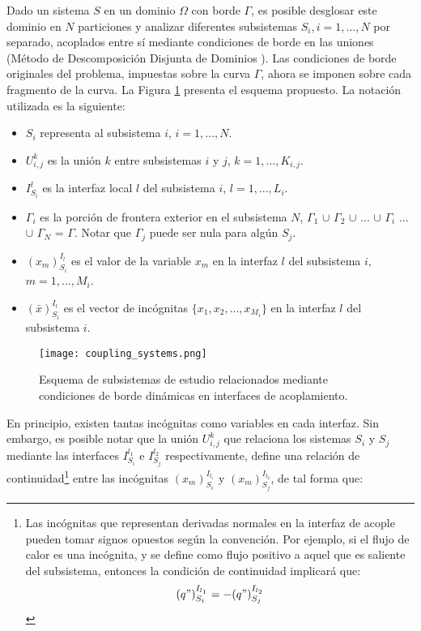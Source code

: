 Dado un sistema $S$ en un dominio $\Omega$ con borde $\Gamma$, es posible desglosar este dominio en $N$ particiones 
y analizar diferentes subsistemas $S_i,i=1,...,N$ por separado, acoplados entre sí mediante condiciones de borde en las uniones
(Método de Descomposición Disjunta de Dominios \cite{ddmethod}).
Las condiciones de borde originales del problema, impuestas sobre la curva $\Gamma$,
ahora se imponen sobre cada fragmento de la curva.
La Figura \ref{esquema-acoplamiento} presenta el esquema propuesto.
La notación utilizada es la siguiente:
\begin{itemize}
\item $S_i$ representa al subsistema $i$, $i=1,...,N$.
\item $U_{i,j}^k$ es la unión $k$ entre subsistemas $i$ y $j$, $k=1,...,K_{i,j}$.
\item $I_{S_i}^{l}$ es la interfaz local $l$ del subsistema $i$, $l=1,...,L_i$.
\item $\Gamma_i$ es la porción de frontera exterior en el subsistema $N$,
 $\Gamma_1$ $\cup$ $\Gamma_2$ $\cup$ ... $\cup$ $\Gamma_i$ ...  $\cup$ $\Gamma_N$ = $\Gamma$.
 Notar que $\Gamma_j$ puede ser nula para algún $S_j$.
\item ${(x_m)_{S_i}^{I_l}}$ es el valor de la variable $x_m$ en la interfaz ${l}$ del subsistema ${i}$, $m=1,...,M_i$.
\item ${(\bar{x})_{S_i}^{I_l}}$ es el vector de incógnitas $\{x_1,x_2,...,x_{M_i}\}$ en la interfaz ${l}$ del subsistema ${i}$.
\end{itemize}

\begin{figure}[ht]
\centering{}\texttt{[image: coupling\_systems.png]}
\caption[Esquema de descomposición disjunta de dominios]{Esquema de subsistemas de estudio relacionados mediante condiciones de borde dinámicas en interfaces de acoplamiento.} 
\label{esquema-acoplamiento} 
\end{figure}

En principio, existen tantas incógnitas como variables en cada interfaz.
Sin embargo, es posible notar que la unión $U_{i,j}^k$ que relaciona los sistemas $S_{i}$ y $S_{j}$ 
mediante las interfaces $I_{S_{i}}^{l_1}$ e $I_{S_{j}}^{l_2}$ respectivamente, 
define una relación de continuidad\footnote{
Las incógnitas que representan derivadas normales en la interfaz de acople pueden tomar signos opuestos según la convención.
Por ejemplo, si el flujo de calor es una incógnita, 
y se define como flujo positivo a aquel que es saliente del subsistema, 
entonces la condición de continuidad implicará que:
\begin{equation*}
{(q")_{S_i}^{I_{l_1}}}=-{(q")_{S_j}^{I_{l_2}}}
\label{continuidad-q}
\end{equation*}
} entre las incógnitas ${(x_m)_{S_i}^{I_{l_1}}}$ y ${(x_m)_{S_j}^{I_{l_2}}}$, de tal forma que:

